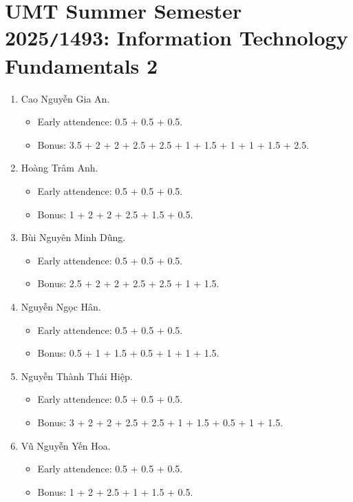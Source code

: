 \documentclass{article}
\begin{document}

\section{UMT Summer Semester 2025{\tt/}1493: Information Technology Fundamentals 2}

\begin{enumerate}
	\item {\sc Cao Nguyễn Gia An.}
	\begin{itemize}
		\item Early attendence: 0.5 + 0.5 + 0.5.
		\item Bonus: 3.5 + 2 + 2 + 2.5 + 2.5 + 1 + 1.5 + 1 + 1 + 1.5 + 2.5.
	\end{itemize}
	\item {\sc Hoàng Trâm Anh.}
	\begin{itemize}
		\item Early attendence: 0.5 + 0.5 + 0.5.
		\item Bonus: 1 + 2 + 2 + 2.5 + 1.5 + 0.5.
	\end{itemize}
	\item {\sc Bùi Nguyên Minh Dũng.}
	\begin{itemize}
		\item Early attendence: 0.5 + 0.5 + 0.5.
		\item Bonus: 2.5 + 2 + 2 + 2.5 + 2.5 + 1 + 1.5.
	\end{itemize}
	\item {\sc Nguyễn Ngọc Hân.}
	\begin{itemize}
		\item Early attendence: 0.5 + 0.5 + 0.5.
		\item Bonus: 0.5 + 1 + 1.5 + 0.5 + 1 + 1 + 1.5.
	\end{itemize}
	\item {\sc Nguyễn Thành Thái Hiệp.}
	\begin{itemize}
		\item Early attendence: 0.5 + 0.5 + 0.5.
		\item Bonus: 3 + 2 + 2 + 2.5 + 2.5 + 1 + 1.5 + 0.5 + 1 + 1.5.
	\end{itemize}
	\item {\sc Vũ Nguyễn Yến Hoa.}
	\begin{itemize}
		\item Early attendence: 0.5 + 0.5 + 0.5.
		\item Bonus: 1 + 2 + 2.5 + 1 + 1.5 + 0.5.
	\end{itemize}

\end{enumerate}
\end{document}
